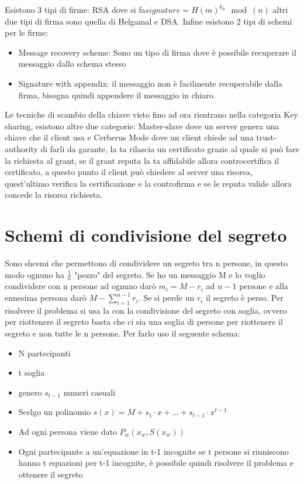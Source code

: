 \documentclass[10pt,a4paper]{article}
\begin{document}
Esistono 3 tipi di firme: RSA dove si fa$signature = H(m)^{k_p} \mod(n)$ altri due tipi di firma sono quella di Helgamal e DSA. Infine esistono 2 tipi di schemi per le firme:
\begin{itemize}
\item Message recovery scheme: Sono un tipo di firma dove è possibile recuperare il messaggio dallo schema stesso
\item Signature with appendix: il messaggio non è facilmente recuperabile dalla firma, bisogna quindi appendere il messaggio in chiaro.
\end{itemize}

Le tecniche di scambio della chiave visto fino ad ora rientrano nella categoria Key sharing, esistono altre due categorie: Master-slave dove un server genera una chiave che il client usa e Cerberus Mode dove un client chiede ad una trust-authority di farli da garante, la ta rilascia un certificato grazie al quale si può fare la richiesta al grant, se il grant reputa la ta affidabile allora controcertifica il certificato, a questo punto il client può chiedere al server una risorsa, quest'ultimo verifica la certificazione e la controfirma e se le reputa valide allora concede la risorsa richiesta.

\section{Schemi di condivisione del segreto}
Sono shcemi che permettono di condividere un segreto tra n persone, in questo modo ognuno ha $\frac{1}{n}$ "pezzo" del segreto. Se ho un messaggio M e lo voglio condividere con n persone ad ognuno darò $m_i=M-r_i$ ad $n-1$ persone e alla ennesima persona darò $M- \sum_{i=1}^{n-1} r_i$. Se si perde un $r_i$ il segreto è perso. Per risolvere il problema si usa la con la condivisione del segreto con soglia, ovvero per riottenere il segreto basta che ci sia una soglia di persone per riottenere il segreto e non tutte le n persone. Per farlo uso il seguente schema:
\begin{itemize}
\item N partecipanti
\item t soglia
\item genero $s_{t-1}$ numeri casuali
\item Scelgo un polinomio $s(x)=M+s_1\cdot x+...+s_{t-1}\cdot x^{t-1}$
\item Ad ogni persona viene dato $P_w(x_w,S(x_w))$ 
\item Ogni partecipante a un'equazione in t-1 incognite se t persone si riuniscono hanno t equazioni per t-1 incognite, è possibile quindi risolvere il problema e ottenere il segreto
\end{itemize}
\end{document}
